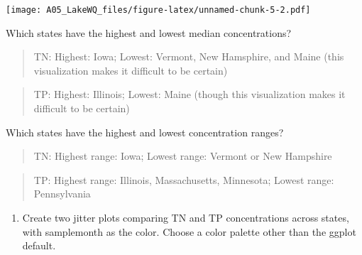\documentclass[]{article}
\providecommand{\tightlist}{%
  \setlength{\itemsep}{0pt}\setlength{\parskip}{0pt}}
\begin{document}
\texttt{[image: A05\_LakeWQ\_files/figure-latex/unnamed-chunk-5-2.pdf]}

Which states have the highest and lowest median concentrations?

\begin{quote}
TN: Highest: Iowa; Lowest: Vermont, New Hamsphire, and Maine (this
visualization makes it difficult to be certain)
\end{quote}

\begin{quote}
TP: Highest: Illinois; Lowest: Maine (though this visualization makes it
difficult to be certain)
\end{quote}

Which states have the highest and lowest concentration ranges?

\begin{quote}
TN: Highest range: Iowa; Lowest range: Vermont or New Hampshire
\end{quote}

\begin{quote}
TP: Highest range: Illinois, Massachusetts, Minnesota; Lowest range:
Pennsylvania
\end{quote}

\begin{enumerate}
\def\labelenumi{\arabic{enumi}.}
\setcounter{enumi}{9}
\tightlist
\item
  Create two jitter plots comparing TN and TP concentrations across
  states, with samplemonth as the color. Choose a color palette other
  than the ggplot default.
\end{enumerate}
\end{document}
